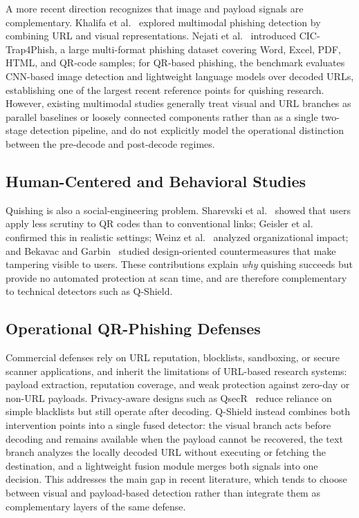 \documentclass[conference]{IEEEtran}
\begin{document}
A more recent direction recognizes that image and payload signals are complementary. Khalifa et al.~\cite{khalifa2025multiphishnet} explored multimodal phishing detection by combining URL and visual representations. Nejati et al.~\cite{nejati2026cic} introduced CIC-Trap4Phish, a large multi-format phishing dataset covering Word, Excel, PDF, HTML, and QR-code samples; for QR-based phishing, the benchmark evaluates CNN-based image detection and lightweight language models over decoded URLs, establishing one of the largest recent reference points for quishing research. However, existing multimodal studies generally treat visual and URL branches as parallel baselines or loosely connected components rather than as a single two-stage detection pipeline, and do not explicitly model the operational distinction between the pre-decode and post-decode regimes.

\subsection{Human-Centered and Behavioral Studies}

Quishing is also a social-engineering problem. Sharevski et al.~\cite{sharevski2022phishing} showed that users apply less scrutiny to QR codes than to conventional links; Geisler et al.~\cite{geisler2024hooked} confirmed this in realistic settings; Weinz et al.~\cite{weinz2025impact} analyzed organizational impact; and Bekavac and Garbin~\cite{bekavac2024qr} studied design-oriented countermeasures that make tampering visible to users. These contributions explain \emph{why} quishing succeeds but provide no automated protection at scan time, and are therefore complementary to technical detectors such as Q-Shield.

\subsection{Operational QR-Phishing Defenses}

Commercial defenses rely on URL reputation, blocklists, sandboxing, or secure scanner applications, and inherit the limitations of URL-based research systems: payload extraction, reputation coverage, and weak protection against zero-day or non-URL payloads. Privacy-aware designs such as QsecR~\cite{rafsanjani2023qsecr} reduce reliance on simple blacklists but still operate after decoding. Q-Shield instead combines both intervention points into a single fused detector: the visual branch acts before decoding and remains available when the payload cannot be recovered, the text branch analyzes the locally decoded URL without executing or fetching the destination, and a lightweight fusion module merges both signals into one decision. This addresses the main gap in recent literature, which tends to choose between visual and payload-based detection rather than integrate them as complementary layers of the same defense.
\end{document}
